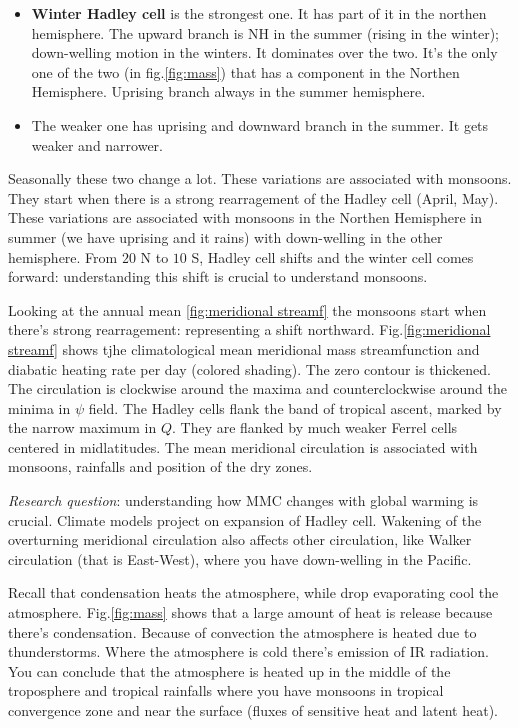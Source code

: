 \begin{itemize}
    \item \textbf{Winter Hadley cell} is the strongest one. It has part of it in the northen hemisphere. The upward branch is NH in the summer (rising in the winter); down-welling motion in the winters. It dominates over the two. It's the only one of the two (in fig.\ref{fig:mass}) that has a component in the Northen Hemisphere. Uprising branch always in the summer hemisphere.
    \item The weaker one has uprising and downward branch in the summer. It gets weaker and narrower.
\end{itemize}
Seasonally these two change a lot. These variations are associated with monsoons. They start when there is a strong rearragement of the Hadley cell (April, May). 
These variations are associated with monsoons in the Northen Hemisphere in summer (we have uprising and it rains) with down-welling in the other hemisphere. From $20$ N to $10$ S, Hadley cell shifts and the winter cell comes forward: understanding this shift is crucial to understand monsoons. 


Looking at the annual mean \ref{fig:meridional streamf} the monsoons start when there's strong rearragement: representing a shift northward. Fig.\ref{fig:meridional streamf} shows tjhe climatological mean meridional mass streamfunction and diabatic heating rate per day (colored shading). The zero contour is thickened. The circulation is clockwise around the maxima and counterclockwise around the minima in $\psi$ field. The Hadley cells flank the band of tropical ascent, marked by the narrow maximum in $Q$. They are flanked by much weaker Ferrel cells centered in midlatitudes.
The mean meridional circulation is associated with monsoons, rainfalls and position of the dry zones. 


\textit{Research question}: understanding how MMC changes with global warming is crucial. Climate models project on expansion of Hadley cell. Wakening of the overturning meridional circulation also affects other circulation, like Walker circulation (that is East-West), where you have down-welling in the Pacific. 


Recall that condensation heats the atmosphere, while drop evaporating cool the atmosphere. Fig.\ref{fig:mass} shows that a large amount of heat is release because there's condensation. Because of convection the atmosphere is heated due to thunderstorms. Where the atmosphere is cold there's emission of IR radiation. You can conclude that the atmosphere is heated up in the middle of the troposphere and tropical rainfalls where you have monsoons in tropical convergence zone and near the surface (fluxes of sensitive heat and latent heat).
